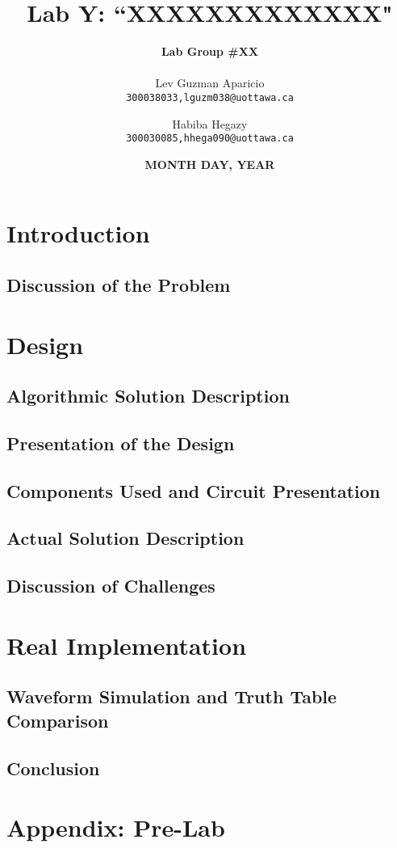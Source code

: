 \documentclass[16pt, letterpaper]{article}
\title{ 
	\textbf{\huge Lab Y: ``XXXXXXXXXXXXX" } \newline \newline {\Large CEG2136 Section A \\ TA('s): ``xxxx" }
	   }
\author{\textbf{\Large Lab Group \#XX} \\ \\
	Lev Guzman Aparicio\\
	\texttt{300038033,lguzm038@uottawa.ca}
	\and 
	Habiba Hegazy\\
	\texttt{300030085,hhega090@uottawa.ca} 	
		}
\date{\textbf{MONTH DAY, YEAR}}
\begin{document}
	
	\begin{titlepage}
		\maketitle
	\end{titlepage}

	{ \large \tableofcontents }
	\newpage
	



		\section{Introduction}
		
		
		
			\subsection{Discussion of the Problem}
			
			
	
		\section{Design}
		
			\subsection{Algorithmic Solution Description}
			
			
			
			\subsection{Presentation of the Design}
			
			
			
			\subsection{Components Used and Circuit Presentation}
			
			
			
			\subsection{Actual Solution Description}
			
			
			
			\subsection{Discussion of Challenges}
			
			
			
		\section{Real Implementation}
		
			\subsection{Waveform Simulation and Truth Table Comparison}
			
			
			\subsection{Conclusion}
			
		\section{Appendix: Pre-Lab}
	
\end{document}
